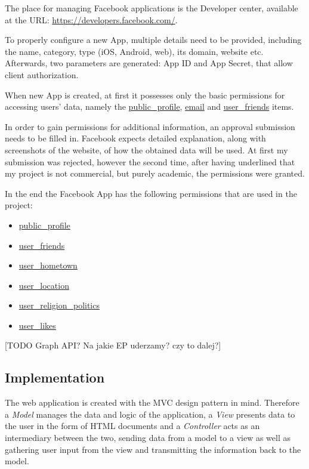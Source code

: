 \documentclass[12pt]{report}
\begin{document}
The place for managing Facebook applications is the Developer center, available at the URL: \url{https://developers.facebook.com/}.

To properly configure a new App, multiple details need to be provided, including the name, category, type (iOS, Android, web), its domain, website etc. Afterwards, two parameters are generated: App ID and App Secret, that allow client authorization.

When new App is created, at first it possesses only the basic permissions for accessing users' data, namely the \url{public_profile}, \url{email} and \url{user_friends} items.

In order to gain permissions for additional information, an approval submission needs to be filled in. Facebook expects detailed explanation, along with screenshots of the website, of how the obtained data will be used. At first my submission was rejected, however the second time, after having underlined that my project is not commercial, but purely academic, the permissions were granted.

In the end the Facebook App has the following permissions that are used in the project:
\begin{itemize}
\item \url{public_profile}
\item \url{user_friends}
\item \url{user_hometown}
\item \url{user_location}
\item \url{user_religion_politics}
\item \url{user_likes}
\end{itemize}

[TODO Graph API? Na jakie EP uderzamy? czy to dalej?]

\subsection{Implementation}

The web application is created with the MVC design pattern in mind. Therefore a \textit{Model} manages the data and logic of the application, a \textit{View} presents data to the user in the form of HTML documents and a \textit{Controller} acts as an intermediary between the two, sending data from a model to a view as well as gathering user input from the view and transmitting the information back to the model.
\end{document}
